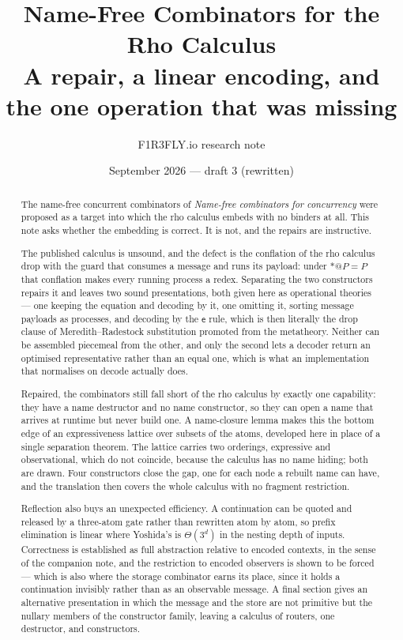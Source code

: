 \documentclass[11pt]{article}
\title{\textbf{Name-Free Combinators for the Rho Calculus}\\[4pt]
\large A repair, a linear encoding, and the one operation that was missing}
\author{F1R3FLY.io research note}
\date{September 2026 --- draft 3 (rewritten)}
\makeatletter
\theoremstyle{plain}
\theoremstyle{definition}
\theoremstyle{remark}
\newcommand{\quo}[1]{@#1}
\newcommand{\drp}[1]{{*}#1}
\newcommand{\ev}{\mathsf{e}}
\makeatother
\begin{document}
\maketitle

\begin{abstract}
\noindent
The name-free concurrent combinators of \emph{Name-free combinators for
concurrency} were proposed as a target into which the rho calculus embeds
with no binders at all. This note asks whether the embedding is correct. It
is not, and the repairs are instructive.

The published calculus is unsound, and the defect is the conflation of the
rho calculus drop with the guard that consumes a message and runs its
payload: under $\drp{\quo{P}} = P$ that conflation makes every running
process a redex. Separating the two constructors repairs it and leaves two
sound presentations, both given here as operational theories --- one keeping
the equation and decoding by it, one omitting it, sorting message payloads as
processes, and decoding by the $\ev$ rule, which is then literally the drop
clause of Meredith--Radestock substitution promoted from the metatheory.
Neither can be assembled piecemeal from the other, and only the second lets a
decoder return an optimised representative rather than an equal one, which is
what an implementation that normalises on decode actually does.

Repaired, the combinators still fall short of the rho calculus by exactly one
capability: they have a name destructor and no name constructor, so they can
open a name that arrives at runtime but never build one. A name-closure lemma
makes this the bottom edge of an expressiveness lattice over subsets of the
atoms, developed here in place of a single separation theorem. The lattice
carries two orderings, expressive and observational, which do not coincide,
because the calculus has no name hiding; both are drawn. Four constructors
close the gap, one for each node a rebuilt name can have, and the translation
then covers the whole calculus with no fragment restriction.

Reflection also buys an unexpected efficiency. A continuation can be quoted
and released by a three-atom gate rather than rewritten atom by atom, so
prefix elimination is linear where Yoshida's is $\Theta(3^{d})$ in the
nesting depth of inputs. Correctness is established as full abstraction
relative to encoded contexts, in the sense of the companion note, and the
restriction to encoded observers is shown to be forced --- which is also
where the storage combinator earns its place, since it holds a continuation
invisibly rather than as an observable message. A final section gives an
alternative presentation in which the message and the store are not primitive
but the nullary members of the constructor family, leaving a calculus of
routers, one destructor, and constructors.
\end{abstract}
\end{document}
